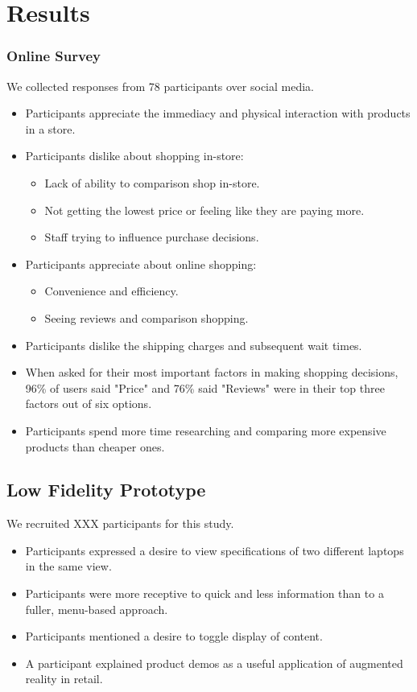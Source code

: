 \section{Results}

\subsubsection{Online Survey}
We collected responses from 78 participants over social media. 

\begin{itemize}
\item Participants appreciate the immediacy and physical interaction with products in a store.
\item Participants dislike about shopping in-store:
	\begin{itemize} \compresslist%
		\item Lack of ability to comparison shop in-store.
		\item Not getting the lowest price or feeling like they are paying more.
		\item Staff trying to influence purchase decisions.
	\end{itemize}
\item Participants appreciate about online shopping:
	\begin {itemize} \compresslist%
		\item Convenience and efficiency.
		\item Seeing reviews and comparison shopping.
	\end{itemize}
\item Participants dislike the shipping charges and subsequent wait times.
\item When asked for their most important factors in making shopping decisions, 96\% of users said "Price" and 76\% said "Reviews" were in their top three factors out of six options.
\item Participants spend more time researching and comparing more expensive products than cheaper ones.
\end{itemize}

\subsection{Low Fidelity Prototype}
We recruited XXX participants for this study. 
\begin{itemize}
	\item Participants expressed a desire to view specifications of two different laptops in the same view.
	\item Participants were more receptive to quick and less information than to a fuller, menu-based approach.
	\item Participants mentioned a desire to toggle display of content.
	\item A participant explained product demos as a useful application of augmented reality in retail.
\end{itemize}

